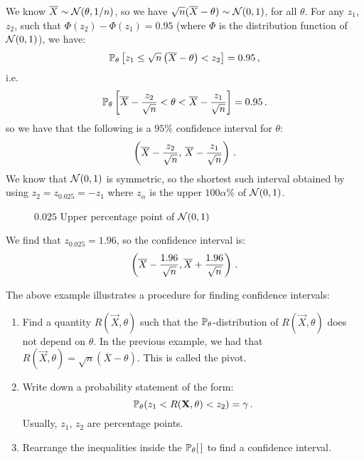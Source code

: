 We know $\overline{X} \sim \mathcal{N}(\theta, 1/n)$, so we have $\sqrt{n}(\overline{X} - \theta) \sim \mathcal{N}(0, 1)$, for all $\theta$. For any $z_1$, $z_2$, such that $\Phi(z_2) - \Phi(z_1) = 0.95$ (where $\Phi$ is the distribution function of $\mathcal{N}(0, 1)$), we have:
\[
\mathbb{P}_\theta \left[ z_1 \leq \sqrt{n}\left(\overline{X} - \theta\right) < z_2 \right] = 0.95 \, {,}
\]
i.e.
\[
\mathbb{P}_\theta \left[ \overline{X} - \frac{z_2}{\sqrt{n}} < \theta < \overline{X} - \frac{z_1}{\sqrt{n}} \right] = 0.95 \, {.}
\]
so we have that the following is a $95\%$ confidence interval for $\theta$:
\[
\left( \overline{X} - \frac{z_2}{\sqrt{n}}, \, \overline{X} - \frac{z_1}{\sqrt{n}} \right) \, {.}
\]
We know that $\mathcal{N}(0, 1)$ is symmetric, so the shortest such interval obtained by using $z_2 = z_{0.025} = -z_1$ where $z_\alpha$ is the upper $100\alpha\%$ of $\mathcal{N}(0, 1)$.
\begin{figure}
  \centering


  \caption{$0.025$ Upper percentage point of $\mathcal{N}(0, 1)$}
  \label{fig:5.1}
\end{figure}
We find that $z_{0.025} = 1.96$, so the confidence interval is:
\[
\left(\overline{X} - \frac{1.96}{\sqrt{n}}, \overline{X} + \frac{1.96}{\sqrt{n}} \right) \, {.}
\]

The above example illustrates a procedure for finding confidence intervals:
\begin{enumerate}
\item Find a quantity $R(\vec{X}, \theta)$ such that the $\mathbb{P}_\theta$-distribution of $R(\vec{X}, \theta)$ does not depend on $\theta$.
In the previous example, we had that $R(\vec{X}, \theta) = \sqrt{n}(\overline{X} - \theta)$. This is called the pivot.

\item Write down a probability statement of the form:
\[
\mathbb{P}_\theta(z_1 < R(\mathbf{X}, \theta) < z_2) = \gamma \, {.}
\]
Usually, $z_1$, $z_2$ are percentage points.

\item Rearrange the inequalities inside the $\mathbb{P}_\theta[ \, ]$ to find a confidence interval.
\end{enumerate}

